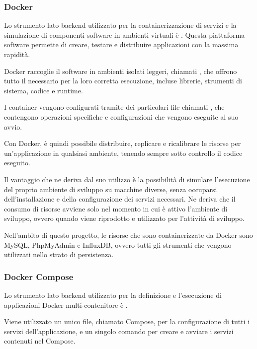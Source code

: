\documentclass[../../../manuale-sviluppatore.tex]{subfiles}
\begin{document}
\subsubsection{Docker}%
\label{subs:docker}

Lo strumento lato backend utilizzato per la containerizzazione di servizi e la simulazione di componenti software in ambienti virtuali è . Questa piattaforma software permette di creare, testare e distribuire applicazioni con la massima rapidità. 

Docker raccoglie il software in ambienti isolati leggeri, chiamati , che offrono tutto il necessario per la loro corretta esecuzione, incluse librerie, strumenti di sistema, codice e runtime. 

I container vengono configurati tramite dei particolari file chiamati , che contengono operazioni specifiche e configurazioni che vengono eseguite al suo avvio.

Con Docker, è quindi possibile distribuire, replicare e ricalibrare le risorse per un'applicazione in qualsiasi ambiente, tenendo sempre sotto controllo il codice eseguito.

Il vantaggio che ne deriva dal suo utilizzo è la possibilità di simulare l'esecuzione del proprio ambiente di sviluppo su macchine diverse, senza occuparsi dell'installazione e della configurazione dei servizi necessari. Ne deriva che il consumo di risorse avviene solo nel momento in cui è attivo l'ambiente di sviluppo, ovvero quando viene riprodotto e utilizzato per l'attività di sviluppo.

Nell'ambito di questo progetto, le risorse che sono containerizzate da Docker sono MySQL, PhpMyAdmin e InfluxDB, ovvero tutti gli strumenti che vengono utilizzati nello strato di persistenza.

\subsubsection{Docker Compose}%
\label{subs:docker_compose}

Lo strumento lato backend utilizzato per la definizione e l'esecuzione di applicazioni Docker multi-contenitore è .

Viene utilizzato un unico file, chiamato Compose, per la configurazione di tutti i servizi dell'applicazione, e un singolo comando per creare e avviare i servizi contenuti nel Compose.
\end{document}
